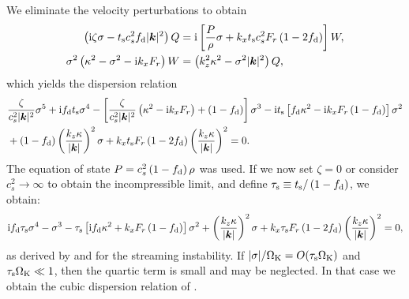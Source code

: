 We eliminate the velocity perturbations to obtain
\begin{align}
  \left(\mathrm{i} \zeta \sigma - t_\mathrm{s} c_s^2 f_\mathrm{d} |\bm{k}|^2\right)Q &=
  \mathrm{i} \left[
  \frac{P}{\rho}\sigma + k_xt_\mathrm{s} c_s^2 F_r\left(1 -
  2f_\mathrm{d}\right)\right]W, \\
   \sigma^2 \left( \kappa^2 - \sigma^2 - \mathrm{i} k_x F_r\right)W &=
    \left(k_z^2\kappa^2 - \sigma^2|\bm{k}|^2\right)Q, 
\end{align}
which yields the dispersion relation
\begin{align}
  &\frac{\zeta}{c_s^2|\bm{k}|^2}\sigma^5 + \mathrm{i} f_\mathrm{d} t_\mathrm{s}
  \sigma^4 - \left[ \frac{\zeta}{c_s^2|\bm{k}|^2} \left(\kappa^2 - \mathrm{i}
  k_x F_r\right) + \left(1 - f_\mathrm{d}\right)\right]\sigma^3 - \mathrm{i}
  t_\mathrm{s} \left[f_\mathrm{d} \kappa^2 - \mathrm{i} k_x F_r\left( 1 -
  f_\mathrm{d}\right)\right]\sigma^2 \notag\\ 
  &+ \left(1 -
  f_\mathrm{d}\right)\left(\frac{k_z\kappa}{|\bm{k}|}\right)^2\sigma +
  k_x t_\mathrm{s} F_r\left(1 - 2f_\mathrm{d}\right)
  \left(\frac{k_z\kappa}{|\bm{k}|}\right)^2  = 0.\label{streaming_dispersion}
\end{align}
The equation of state $P = c_s^2\left( 1 - f_\mathrm{d}\right)\rho$
was used. If we now set $\zeta = 0$ or consider $c_s^2\to \infty$ to
obtain the 
incompressible limit, and define $\tau_\mathrm{s} \equiv
t_\mathrm{s}/\left(1 - f_\mathrm{d}\right)$, we obtain: 
\begin{align*}
\mathrm{i} f_\mathrm{d} \tau_\mathrm{s}
  \sigma^4 - \sigma^3 - 
  \tau_\mathrm{s} \left[ \mathrm{i} f_\mathrm{d} \kappa^2 + k_x F_r\left( 1 -
  f_\mathrm{d}\right)\right]\sigma^2 
  + \left(\frac{k_z\kappa}{|\bm{k}|}\right)^2\sigma + 
  k_x \tau_\mathrm{s} F_r\left(1 - 2f_\mathrm{d}\right)
  \left(\frac{k_z\kappa}{|\bm{k}|}\right)^2  = 0,
\end{align*}
as derived by \cite{jacquet11} and \cite{laibe14} for the streaming
instability. If $|\sigma|/\Omega_{\rm K} = O(\tau_\mathrm{s}\Omega_{\rm K})$ and
$\tau_\mathrm{s}\Omega_{\rm K}\ll 1$, then the quartic term
is small and may be neglected. In that case we obtain the cubic
dispersion relation of \citet{youdin05a}. 
